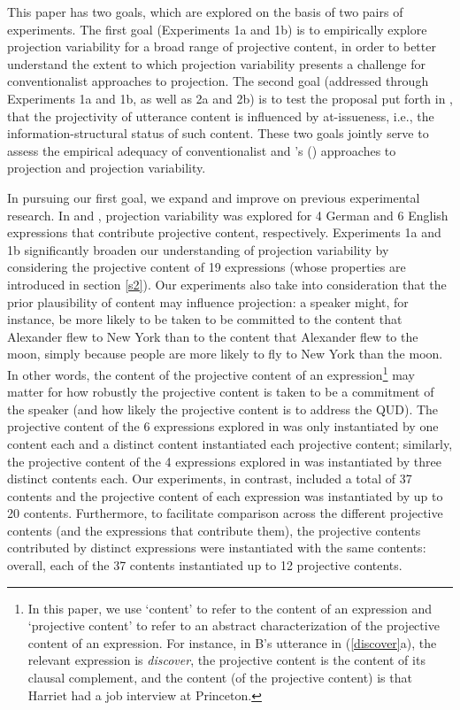\documentclass[11pt,fleqn]{article}
\newcommand{\6}{\mbox{$[\hspace*{-.6mm}[$}}
\newcommand{\9}{\mbox{$]\hspace*{-.6mm}]$}}
\newcommand{\citetpos}[1]{\citeauthor{#1}'s (\citeyear{#1})}
\begin{document}
This paper has two goals, which are explored on the basis of two pairs of experiments. The first goal (Experiments 1a and 1b) is to empirically explore projection variability for a broad range of projective content, in order to better understand the extent to which projection variability presents a challenge for conventionalist approaches to projection. The second goal (addressed through Experiments 1a and 1b, as well as 2a and 2b) is to test the proposal put forth in \citealt{brst-salt10}, that the projectivity of utterance content is influenced by at-issueness, i.e., the information-structural status of such content. These two goals jointly serve to assess the empirical adequacy of conventionalist and \citetpos{brst-salt10} approaches to projection and projection variability.

In pursuing our first goal, we expand and improve on previous experimental research. In \citealt{xue-onea11} and \citealt{smith-hall11}, projection variability was explored for 4 German and 6 English expressions that contribute projective content, respectively. Experiments 1a and 1b significantly broaden our understanding of projection variability by considering the projective content of 19 expressions (whose properties are introduced in section \ref{s2}). Our experiments also take into consideration that the prior plausibility of content may influence projection: a speaker might, for instance, be more likely to be taken to be committed to the content that Alexander flew to New York than to the content that Alexander flew to the moon, simply because people are more likely to fly to New York than the moon. In other words, the content of the projective content of an expression\footnote{In this paper, we use `content' to refer to the content of an expression and `projective content' to refer to an abstract characterization of the projective content of an expression. For instance, in B's utterance in (\ref{discover}a), the relevant expression is {\em discover}, the projective content is the content of its clausal complement, and the content (of the projective content) is that Harriet had a job interview at Princeton.} may matter for how robustly the projective content is taken to be a commitment of the speaker (and how likely the projective content is to address the QUD). The projective content of the 6 expressions explored in \citealt{smith-hall11} was only instantiated by one content each and a distinct content instantiated each projective content; similarly, the projective content of the 4 expressions explored in \citealt{xue-onea11} was instantiated by three distinct contents each. Our experiments, in contrast, included a total of 37 contents and the projective content of each expression was instantiated by up to 20 contents. Furthermore, to facilitate comparison across the different projective contents (and the expressions that contribute them), the projective contents contributed by distinct expressions were instantiated with the same contents: overall, each of the 37 contents instantiated up to 12 projective contents.
\end{document}
